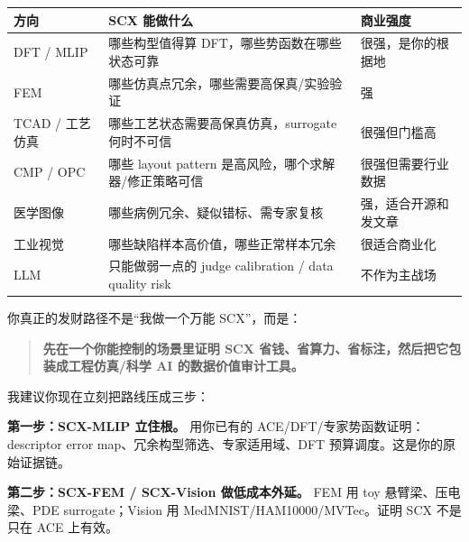 \documentclass[
  12pt,
]{ctexart}
\begin{document}
\begin{longtable}[]{@{}
  >{\raggedright\arraybackslash}p{}
  >{\raggedright\arraybackslash}p{}
  >{\raggedright\arraybackslash}p{}@{}}
\toprule\noalign{}
\begin{minipage}[b]{\linewidth}\raggedright
方向
\end{minipage} & \begin{minipage}[b]{\linewidth}\raggedright
SCX 能做什么
\end{minipage} & \begin{minipage}[b]{\linewidth}\raggedright
商业强度
\end{minipage} \\
\midrule\noalign{}
\endhead
\bottomrule\noalign{}
\endlastfoot
DFT / MLIP & 哪些构型值得算 DFT，哪些势函数在哪些状态可靠 &
很强，是你的根据地 \\
FEM & 哪些仿真点冗余，哪些需要高保真/实验验证 & 强 \\
TCAD / 工艺仿真 & 哪些工艺状态需要高保真仿真，surrogate 何时不可信 &
很强但门槛高 \\
CMP / OPC & 哪些 layout pattern 是高风险，哪个求解器/修正策略可信 &
很强但需要行业数据 \\
医学图像 & 哪些病例冗余、疑似错标、需专家复核 & 强，适合开源和发文章 \\
工业视觉 & 哪些缺陷样本高价值，哪些正常样本冗余 & 很适合商业化 \\
LLM & 只能做弱一点的 judge calibration / data quality risk &
不作为主战场 \\
\end{longtable}

你真正的发财路径不是``我做一个万能 SCX''，而是：

\begin{quote}
\textbf{先在一个你能控制的场景里证明 SCX
省钱、省算力、省标注，然后把它包装成工程仿真/科学 AI
的数据价值审计工具。}
\end{quote}

我建议你现在立刻把路线压成三步：

\textbf{第一步：SCX-MLIP 立住根。} 用你已有的
ACE/DFT/专家势函数证明：descriptor error
map、冗余构型筛选、专家适用域、DFT 预算调度。这是你的原始证据链。

\textbf{第二步：SCX-FEM / SCX-Vision 做低成本外延。} FEM 用 toy
悬臂梁、压电梁、PDE surrogate；Vision 用 MedMNIST/HAM10000/MVTec。证明
SCX 不是只在 ACE 上有效。
\end{document}
